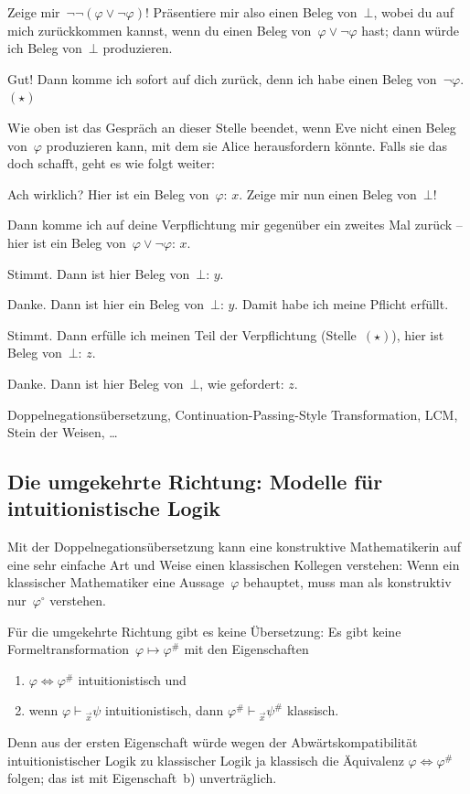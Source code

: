 \documentclass[a4paper,ngerman,12pt]{scrartcl}
\theoremstyle{definition}
\theoremstyle{plain}
\theoremstyle{remark}
\newcommand{\seq}[1]{\mathrel{\vdash\!\!\!_{#1}}}
\renewcommand{\_}{\mathpunct{.}\,}
\newcommand{\?}{\,{:}\,}
\newcommand{\Alice}{\item[Alice]}
\newcommand{\Eve}{\item[Eve]}
\newenvironment{dialogue}{%
  \begin{list}{}{%
    \settowidth{\labelwidth}{\qquad\emph{Alice:}}
    \setlength{\labelsep}{0.3cm}
    \setlength{\leftmargin}{\labelwidth}
    \addtolength{\leftmargin}{\labelsep}
    \setlength{\rightmargin}{0pt}
    \setlength{\parsep}{0.5ex plus 0.2ex minus 0.1ex}
    \setlength{\itemsep}{0 ex plus 0.2ex}
    \renewcommand{\makelabel}[1]{\qquad\emph{##1:}\hfil}
    }
}{\end{list}}
\begin{document}
\begin{dialogue}
\Eve Zeige mir~$\neg\neg(\varphi \vee \neg\varphi)$!
Präsentiere mir also einen Beleg von~$\bot$, wobei du auf mich zurückkommen
kannst, wenn du einen Beleg von~$\varphi \vee \neg\varphi$ hast; dann
würde ich Beleg von~$\bot$ produzieren.
\Alice Gut! Dann komme ich sofort auf dich zurück, denn ich habe einen Beleg
von~$\neg\varphi$. $(\star)$
\end{dialogue}

Wie oben ist das Gespräch an dieser Stelle beendet, wenn Eve nicht einen Beleg
von~$\varphi$ produzieren kann, mit dem sie Alice herausfordern könnte. Falls
sie das doch schafft, geht es wie folgt weiter:

\begin{dialogue}
\Eve Ach wirklich? Hier ist ein Beleg von~$\varphi$: $x$. Zeige mir nun einen
Beleg von~$\bot$!
\Alice Dann komme ich auf deine Verpflichtung mir gegenüber ein zweites Mal
zurück -- hier ist ein Beleg von~$\varphi \vee \neg\varphi$: $x$.
\Eve Stimmt. Dann ist hier Beleg von~$\bot$: $y$.
\Alice Danke. Dann ist hier ein Beleg von~$\bot$: $y$. Damit habe ich meine
Pflicht erfüllt.
\Eve Stimmt. Dann erfülle ich meinen Teil der Verpflichtung (Stelle~$(\star)$),
hier ist Beleg von~$\bot$: $z$.
\Alice Danke. Dann ist hier Beleg von~$\bot$, wie gefordert: $z$.
\end{dialogue}



Doppelnegationsübersetzung, Continuation-Passing-Style Transformation,
LCM, Stein der Weisen, \ldots



\subsection{Die umgekehrte Richtung: Modelle für intuitionistische Logik}

Mit der Doppelnegationsübersetzung kann eine konstruktive Mathematikerin auf
eine sehr einfache Art und Weise einen klassischen Kollegen verstehen: Wenn ein
klassischer Mathematiker eine Aussage~$\varphi$ behauptet, muss man als
konstruktiv nur~$\varphi^\circ$ verstehen.

Für die umgekehrte Richtung gibt es keine Übersetzung: Es gibt keine
Formeltransformation~$\varphi \mapsto \varphi^\#$ mit den Eigenschaften
\begin{enumerate}
\item $\varphi \Longleftrightarrow \varphi^\#$ intuitionistisch und
\item wenn $\varphi \seq{\vec x} \psi$ intuitionistisch, dann $\varphi^\#
\seq{\vec x} \psi^\#$ klassisch.
\end{enumerate}
Denn aus der ersten Eigenschaft würde wegen der Abwärtskompatibilität
intuitionistischer Logik zu klassischer Logik ja klassisch die Äquivalenz $\varphi \Leftrightarrow
\varphi^\#$ folgen; das ist mit Eigenschaft~b) unverträglich.
\end{document}
